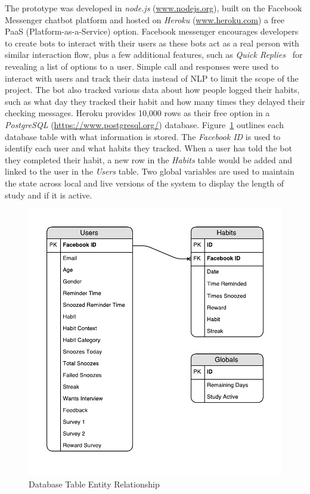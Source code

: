 The prototype was developed in \textit{node.js} (\url{www.nodejs.org}), built on the Facebook Messenger chatbot platform and hosted on \textit{Heroku} (\url{www.heroku.com}) a free PaaS (Platform-as-a-Service) option. Facebook messenger encourages developers to create bots to interact with their users as these bots act as a real person with similar interaction flow, plus a few additional features, such as \textit{Quick Replies}~\cite{doc_fb_quick_replies} for revealing a list of options to a user. Simple call and responses were used to interact with users and track their data instead of NLP to limit the scope of the project. The bot also tracked various data about how people logged their habits, such as what day they tracked their habit and how many times they delayed their checking messages. Heroku provides 10,000 rows as their free option in a \textit{PostgreSQL} (\url{https://www.postgresql.org/}) database. Figure~\ref{fig:db_diagram} outlines each database table with what information is stored. The \textit{Facebook ID} is used to identify each user and what habits they tracked. When a user has told the bot they completed their habit, a new row in the \textit{Habits} table would be added and linked to the user in the \textit{Users} table. Two global variables are used to maintain the state across local and live versions of the system to display the length of study and if it is active.

\begin{figure}[H]
    \centering
    \includegraphics[width=5in]{../resources/diagrams/database-diagram.pdf}
    \caption{Database Table Entity Relationship}
    \label{fig:db_diagram}
\end{figure}

